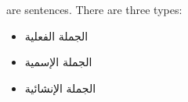 \begin{english}
     are sentences. There are three types:
	\begin{itemize}
		\item \textarabic{الجملة الفعلية}
		\item \textarabic{الجملة الإسمية}
		\item \textarabic{الجملة الإنشائية}
	\end{itemize}
\end{english}